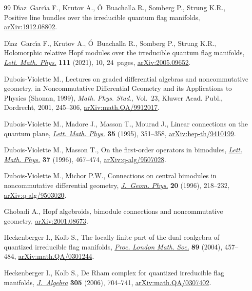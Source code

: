 \begin{thebibliography}{99}
D\'{\i}az~Garc\'{\i}a F., Krutov A., \'O~Buachalla R., Somberg P., Strung K.R.,
 Positive line bundles over the irreducible quantum flag manifolds, \href{https://arxiv.org/abs/1912.08802}{arXiv:1912.08802}.

D\'{\i}az~Garc\'{\i}a F., Krutov A., \'O~Buachalla R., Somberg P., Strung K.R.,
 Holomorphic relative {H}opf modules over the irreducible quantum flag
 manifolds, \href{https://doi.org/10.1007/s11005-020-01340-7}{\textit{Lett. Math. Phys.}} \textbf{111} (2021), 10, 24~pages,
 \href{https://arxiv.org/abs/2005.09652}{arXiv:2005.09652}.

Dubois-Violette M., Lectures on graded differential algebras and noncommutative
 geometry, in Noncommutative Differential Geometry and its Applications to
 Physics ({S}honan, 1999), \textit{Math. Phys. Stud.}, Vol.~23, Kluwer Acad.
 Publ., Dordrecht, 2001, 245--306, \href{https://arxiv.org/abs/math.QA/9912017}{arXiv:math.QA/9912017}.

Dubois-Violette M., Madore J., Masson T., Mourad J., Linear connections on the
 quantum plane, \href{https://doi.org/10.1007/BF00750842}{\textit{Lett. Math. Phys.}} \textbf{35} (1995), 351--358,
 \href{https://arxiv.org/abs/hep-th/9410199}{arXiv:hep-th/9410199}.

Dubois-Violette M., Masson T., On the first-order operators in bimodules,
 \href{https://doi.org/10.1007/BF00312677}{\textit{Lett. Math. Phys.}} \textbf{37} (1996), 467--474,
 \href{https://arxiv.org/abs/q-alg/9507028}{arXiv:q-alg/9507028}.

Dubois-Violette M., Michor P.W., Connections on central bimodules in
 noncommutative differential geometry, \href{https://doi.org/10.1016/0393-0440(95)00057-7}{\textit{J.~Geom. Phys.}} \textbf{20}
 (1996), 218--232, \href{https://arxiv.org/abs/q-alg/9503020}{arXiv:q-alg/9503020}.

Ghobadi A., Hopf algebroids, bimodule connections and noncommutative geometry,
 \href{https://arxiv.org/abs/2001.08673}{arXiv:2001.08673}.

Heckenberger I., Kolb S., The locally finite part of the dual coalgebra of
 quantized irreducible flag manifolds, \href{https://doi.org/10.1112/S0024611504014777}{\textit{Proc. London Math. Soc.}}
 \textbf{89} (2004), 457--484, \href{https://arxiv.org/abs/math.QA/0301244}{arXiv:math.QA/0301244}.

Heckenberger I., Kolb S., De {R}ham complex for quantized irreducible flag
 manifolds, \href{https://doi.org/10.1016/j.jalgebra.2006.02.001}{\textit{J.~Algebra}} \textbf{305} (2006), 704--741,
 \href{https://arxiv.org/abs/math.QA/0307402}{arXiv:math.QA/0307402}.


\end{thebibliography}
